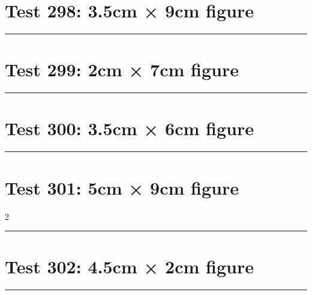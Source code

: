 \documentclass[a4paper,11pt]{article}
\begin{document}
\section*{Test 298: 3.5cm × 9cm figure}
\begin{swarmwrap}%
  \begin{minipage}[t]{3cm}
    \centering
    \rule{\linewidth}{9cm}
  \end{minipage}%
\end{swarmwrap}%
\swarmwrapnext
\lipsum[94]
\lipsum[95]
\lipsum[96]
\lipsum[97]
\section*{Test 299: 2cm × 7cm figure}
\begin{swarmwrap}%
  \begin{minipage}[t]{2cm}
    \centering
    \rule{\linewidth}{7cm}
  \end{minipage}%
\end{swarmwrap}%
\swarmwrapnext
\lipsum[17]
\lipsum[18]
\lipsum[19]
\lipsum[20]
\lipsum[21]
\section*{Test 300: 3.5cm × 6cm figure}
\begin{swarmwrap}%
  \begin{minipage}[t]{3cm}
    \centering
    \rule{\linewidth}{6cm}
  \end{minipage}%
\end{swarmwrap}%
\swarmwrapnext
\lipsum[33]
\lipsum[34]
\lipsum[35]
\lipsum[36]
\section*{Test 301: 5cm × 9cm figure}
\begin{multicols}{2}
  \begin{swarmwrap}%
    \begin{minipage}[t]{5cm}
      \centering
      \rule{\linewidth}{9cm}
    \end{minipage}%
  \end{swarmwrap}%
  \swarmwrapnext
  \lipsum[56]
  \lipsum[57]
  \lipsum[58]
\end{multicols}
\section*{Test 302: 4.5cm × 2cm figure}
\begin{swarmwrap}%
  \begin{minipage}[t]{4cm}
    \centering
    \rule{\linewidth}{2cm}
  \end{minipage}%
\end{swarmwrap}%
\swarmwrapnext
\lipsum[87]
\lipsum[88]
\lipsum[89]
\end{document}
